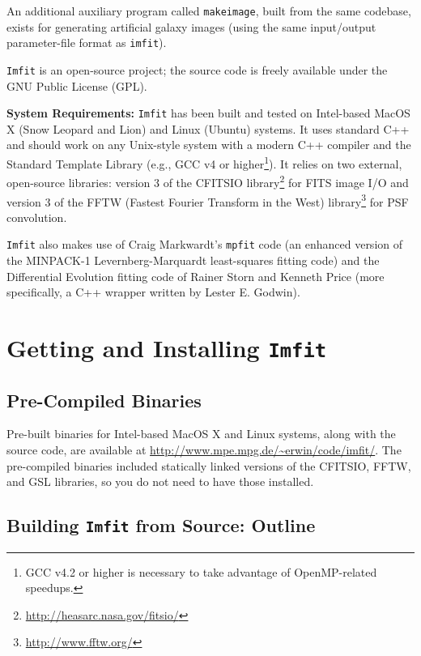 \documentclass[10pt]{article}
\newcommand{\imfit}{\texttt{imfit}}
\newcommand{\Imfit}{\texttt{Imfit}}
\newcommand{\makeimage}{\texttt{makeimage}}
\begin{document}
An additional auxiliary program called \makeimage{}, built from the same
codebase, exists for generating artificial galaxy images (using the same
input/output parameter-file format as \imfit{}).

\Imfit{} is an open-source project; the source code is freely available
under the GNU Public License (GPL).


\bigskip

\textbf{System Requirements:} \Imfit{} has been built and tested on
Intel-based MacOS X (Snow Leopard and Lion) and Linux (Ubuntu) systems. It uses standard C++ and
should work on any Unix-style system with a modern C++ compiler and the
Standard Template Library (e.g., GCC v4 or higher\footnote{GCC v4.2 or higher is
necessary to take advantage of OpenMP-related speedups.}). It relies on two
external, open-source libraries: version 3 of the CFITSIO
library\footnote{\url{http://heasarc.nasa.gov/fitsio/}} for FITS image I/O and
version 3 of the FFTW (Fastest Fourier Transform in the West)
library\footnote{\url{http://www.fftw.org/}} for PSF convolution.

\bigskip

\Imfit{} also makes use of Craig Markwardt's \texttt{mpfit} code (an enhanced
version of the MINPACK-1 Levernberg-Marquardt least-squares fitting code) and 
the Differential Evolution fitting code of Rainer Storn and Kenneth Price
(more specifically, a C++ wrapper written by Lester E. Godwin).



\section{Getting and Installing \Imfit{}}

\subsection{Pre-Compiled Binaries}

Pre-built binaries for Intel-based MacOS X and Linux systems, along with the
source code, are available at
\url{http://www.mpe.mpg.de/~erwin/code/imfit/}. The pre-compiled binaries included
statically linked versions of the CFITSIO, FFTW, and GSL libraries, so you do
not need to have those installed.


\subsection{Building \Imfit{} from Source: Outline}
\end{document}
